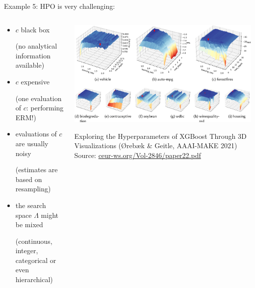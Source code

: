 \documentclass[11pt,compress,t,notes=noshow, xcolor=table]{beamer}
\begin{document}
\begin{vbframe}{Example 5: HPO}
is very challenging:  
\vspace*{-0.2cm} 
\begin{columns}
	\begin{column}{0.6\textwidth}
	\begin{itemize}
		\item $c$ black box \\
		\begin{footnotesize}(no analytical information available)\end{footnotesize}
		\item $c$ expensive \\
		\begin{footnotesize}
		(one evaluation of $c$: performing ERM!)
		\end{footnotesize}
		\item evaluations of $c$ are usually noisy \\
		\begin{footnotesize}
		(estimates are based on resampling)
		\end{footnotesize}
  		\item the search space $\Lambda$ might be mixed 
		\begin{footnotesize}
		(continuous, integer, categorical or even hierarchical)
		\end{footnotesize}
	\end{itemize}
	\end{column}
 	\begin{column}{0.35\textwidth}
		\begin{center}
			\includegraphics[width = 1.0\textwidth]{figure_man/landscapes.png}
			\begin{footnotesize}
				{Exploring the Hyperparameters of XGBoost Through 3D Visualizations ({\O}reb{\ae}k \& Geitle, AAAI-MAKE 2021)}
				\newline
				\tiny{Source: \url{ceur-ws.org/Vol-2846/paper22.pdf}}
			\end{footnotesize}
		\end{center}
  \end{column}
\end{columns}
\end{vbframe}
\end{document}
